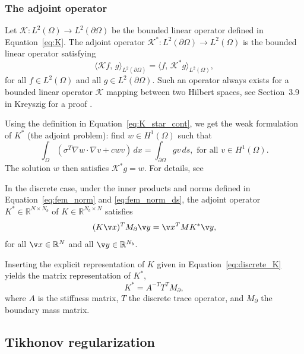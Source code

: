 \subsubsection{The adjoint operator}
Let $\mathcal{K}: L^2(\Omega) \to L^2(\partial\Omega)$ be the bounded linear operator defined in Equation~\eqref{eq:K}. The adjoint operator $\mathcal{K}^*: L^2(\partial\Omega) \to L^2(\Omega)$ is the bounded linear operator satisfying
\begin{equation}\label{eq:K_star_cont}
    \langle \mathcal K f,\, g \rangle_{L^2(\partial\Omega)} =
    \langle f,\, \mathcal K^* g \rangle_{L^2(\Omega)},
\end{equation}
for all $f \in L^2(\Omega)$ and all $g \in L^2(\partial\Omega)$. Such an operator always exists for a bounded linear operator $\mathcal K$ mapping between two Hilbert spaces, see Section~3.9 in Kreyszig for a proof \cite{kreyszigIntroductoryFunctionalAnalysis1989}.

Using the definition in Equation~\eqref{eq:K_star_cont}, we get the weak formulation of $K^*$ (the adjoint problem): find $w \in H^1(\Omega)$ such that
\begin{equation}
    \int_\Omega (\sigma^T \nabla w \cdot \nabla v + c w v) \, dx =
    \int_{\partial\Omega} g v \, ds,
    \text{ for all } v \in H^1(\Omega).
\end{equation}
The solution $w$ then satisfies $\mathcal K^* g = w$. For details, see 

In the discrete case, under the inner products and norms defined in Equation~\eqref{eq:fem_norm} and \eqref{eq:fem_norm_ds}, the adjoint operator $K^* \in \mathbb{R}^{N \times N_b}$ of $K \in \mathbb{R}^{N_b \times N}$ satisfies
\begin{equation}
    (K \v x)^T M_\partial \v y = \v x^T M K^* \v y,
\end{equation}
for all $\v x \in \mathbb R^N$ and all $\v y \in \mathbb R^{N_b}$. 

Inserting the explicit representation of $K$ given in Equation~\eqref{eq:discrete_K} yields the matrix representation of $K^*$,
\begin{equation}
    K^* = A^{-T} T^T M_\partial,
\end{equation}
where $A$ is the stiffness matrix, $T$ the discrete trace operator, and $M_\partial$ the boundary mass matrix.


\subsection{Tikhonov regularization}

